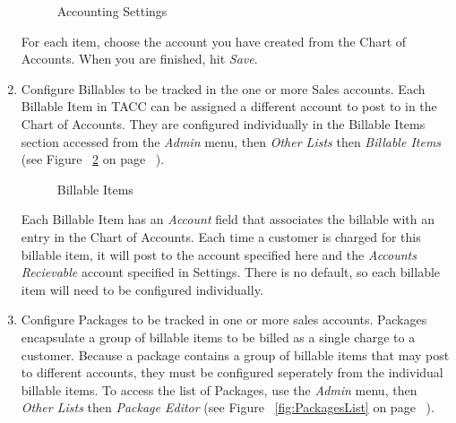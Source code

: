 \begin{enumerate}
\begin{figure}[hbtp]
\caption{ \label{fig:SettingsAccounting} Accounting Settings}
\end{figure}
For each item, choose the account you have created from the Chart of
Accounts.  When you are finished, hit \emph{Save}.
\item Configure Billables to be tracked in the one or more Sales
accounts.  Each Billable Item in TACC can be assigned a different
account to post to in the Chart of Accounts.  They are configured
individually in the Billable Items section accessed from the
\emph{Admin} menu, then \emph{Other Lists} then \emph{Billable Items}
(see Figure ~\ref{fig:BillableItems} on page
~\pageref{fig:BillableItems}).
\begin{figure}[hbtp]
\caption{ \label{fig:BillableItems} Billable Items}
\end{figure}
Each Billable Item has an \emph{Account} field that associates the
billable with an entry in the Chart of Accounts.  Each time a customer
is charged for this billable item, it will post to the account specified
here and the \emph{Accounts Recievable} account specified in
Settings.  There is no default, so each billable item will need to be
configured individually.
\item Configure Packages to be tracked in one or more sales accounts.
Packages encapsulate a group of billable items to be billed as a single
charge to a customer.  Because a package contains a group of billable
items that may post to different accounts, they must be configured
seperately from the individual billable items.  To access the list of
Packages, use the \emph{Admin} menu, then \emph{Other Lists} then
\emph{Package Editor} (see Figure ~\ref{fig:PackagesList} on page
~\pageref{fig:PackagesList}).
\begin{figure}[hbtp]

\end{figure}
\end{enumerate}

